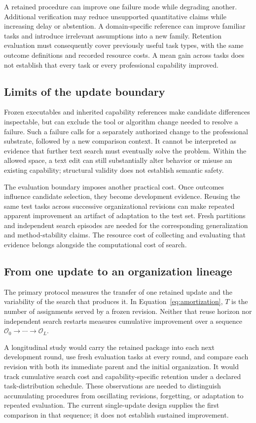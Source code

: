 A retained procedure can improve one failure mode while degrading another. Additional verification may reduce unsupported quantitative claims while increasing delay or abstention. A domain-specific reference can improve familiar tasks and introduce irrelevant assumptions into a new family. Retention evaluation must consequently cover previously useful task types, with the same outcome definitions and recorded resource costs. A mean gain across tasks does not establish that every task or every professional capability improved.

\subsection{Limits of the update boundary}
Frozen executables and inherited capability references make candidate differences inspectable, but can exclude the tool or algorithm change needed to resolve a failure. Such a failure calls for a separately authorized change to the professional substrate, followed by a new comparison context. It cannot be interpreted as evidence that further text search must eventually solve the problem. Within the allowed space, a text edit can still substantially alter behavior or misuse an existing capability; structural validity does not establish semantic safety.

The evaluation boundary imposes another practical cost. Once outcomes influence candidate selection, they become development evidence. Reusing the same test tasks across successive organizational revisions can make repeated apparent improvement an artifact of adaptation to the test set. Fresh partitions and independent search episodes are needed for the corresponding generalization and method-stability claims. The resource cost of collecting and evaluating that evidence belongs alongside the computational cost of search.

\subsection{From one update to an organization lineage}
The primary protocol measures the transfer of one retained update and the variability of the search that produces it. In Equation~\ref{eq:amortization}, $T$ is the number of assignments served by a frozen revision. Neither that reuse horizon nor independent search restarts measures cumulative improvement over a sequence $\mathcal O_0\rightarrow\cdots\rightarrow\mathcal O_L$.

A longitudinal study would carry the retained package into each next development round, use fresh evaluation tasks at every round, and compare each revision with both its immediate parent and the initial organization. It would track cumulative search cost and capability-specific retention under a declared task-distribution schedule. These observations are needed to distinguish accumulating procedures from oscillating revisions, forgetting, or adaptation to repeated evaluation. The current single-update design supplies the first comparison in that sequence; it does not establish sustained improvement.

